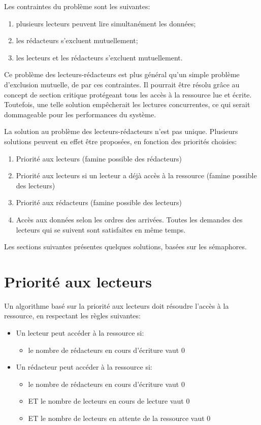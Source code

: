 Les contraintes du problème sont les suivantes:

\begin{enumerate}
\item plusieurs lecteurs peuvent lire simultanément les données;
\item les rédacteurs s'excluent mutuellement;
\item les lecteurs et les rédacteurs s'excluent mutuellement.
\end{enumerate}

Ce problème des lecteurs-rédacteurs est plus général qu'un simple problème d'exclusion mutuelle, de par ces contraintes.
Il pourrait être résolu grâce au concept de section critique protégeant tous les accès à la ressource lue et écrite. Toutefois, une telle solution empêcherait les lectures concurrentes, ce qui serait dommageable pour les performances du système.

La solution au problème des lecteurs-rédacteurs n'est pas unique. Plusieurs solutions peuvent en effet être proposées, en fonction des priorités choisies:

\begin{enumerate}
\item Priorité aux lecteurs (famine possible des rédacteurs)
\item Priorité aux lecteurs si un lecteur a déjà accès à la ressource (famine possible des lecteurs)
\item  Priorité aux rédacteurs (famine possible des lecteurs)
\item Accès aux données selon les ordres des arrivées. Toutes les demandes des lecteurs qui se suivent sont satisfaites en même temps.
\end{enumerate}

Les sections suivantes présentes quelques solutions, basées sur les sémaphores.

\section{Priorité aux lecteurs}

Un algorithme basé sur la priorité aux lecteurs doit résoudre l'accès à la ressource, en respectant les règles suivantes:
\begin{itemize}
\item Un lecteur peut accéder à la ressource si:
\begin{itemize}
\item le nombre de rédacteurs en cours d'écriture vaut 0
\end{itemize}
\item Un rédacteur peut accéder à la ressource si:
\begin{itemize}
\item le nombre de rédacteurs en cours d'écriture vaut 0
\item ET le nombre de lecteurs en cours de lecture vaut 0
\item ET le nombre de lecteurs en attente de la ressource vaut 0
\end{itemize}
\end{itemize}

